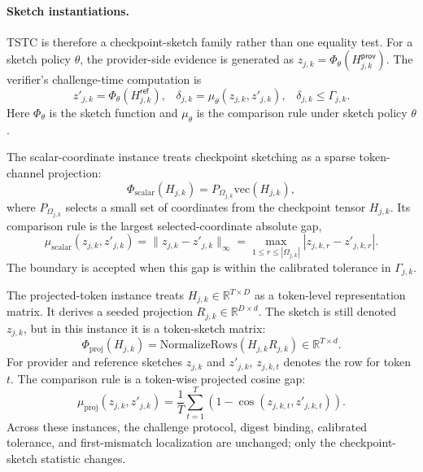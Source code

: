 \documentclass[sigplan,screen,review,anonymous]{acmart}
\begin{document}
\paragraph{Sketch instantiations.}
TSTC is therefore a checkpoint-sketch family rather than one equality test.
For a sketch policy \(\theta\), the provider-side evidence is generated as
\(z_{j,k}=\Phi_{\theta}(H^{\mathsf{prov}}_{j,k})\). The verifier's
challenge-time computation is
\begin{equation}
z'_{j,k}=\Phi_{\theta}(H^{\mathsf{ref}}_{j,k}),\;\;\;
\delta_{j,k}=\mu_{\theta}(z_{j,k},z'_{j,k}),\;\;\;
\delta_{j,k}\le\Gamma_{j,k}.
\end{equation}
Here \(\Phi_{\theta}\) is the sketch function and \(\mu_{\theta}\) is the
comparison rule under sketch policy \(\theta\).

The scalar-coordinate instance treats checkpoint sketching as a sparse
token-channel projection:
\begin{equation}
\Phi_{\mathrm{scalar}}(H_{j,k})
  = P_{\Omega_{j,k}}\mathrm{vec}(H_{j,k}),
\end{equation}
where \(P_{\Omega_{j,k}}\) selects a small set of coordinates from the
checkpoint tensor \(H_{j,k}\). Its comparison rule is the largest selected-coordinate
absolute gap,
\begin{equation}
\mu_{\mathrm{scalar}}(z_{j,k},z'_{j,k})
  = \|z_{j,k}-z'_{j,k}\|_{\infty}
  = \max_{1\le r\le|\Omega_{j,k}|}|z_{j,k,r}-z'_{j,k,r}|.
\end{equation}
The boundary is accepted when this gap is within the calibrated tolerance in
\(\Gamma_{j,k}\).

The projected-token instance treats
\(H_{j,k}\in\mathbb{R}^{T\times D}\) as a token-level representation matrix.
It derives a seeded projection \(R_{j,k}\in\mathbb{R}^{D\times d}\). The
sketch is still denoted \(z_{j,k}\), but in this instance it is a
token-sketch matrix:
\begin{equation}
\Phi_{\mathrm{proj}}(H_{j,k})
  =\mathrm{NormalizeRows}(H_{j,k}R_{j,k})\in\mathbb{R}^{T\times d}.
\end{equation}
For provider and reference sketches \(z_{j,k}\) and \(z'_{j,k}\),
\(z_{j,k,t}\) denotes the row for token \(t\). The comparison rule is a
token-wise projected cosine gap:
\begin{equation}
\mu_{\mathrm{proj}}(z_{j,k},z'_{j,k})
  = \frac{1}{T}\sum_{t=1}^{T}
    \left(1-\cos(z_{j,k,t},z'_{j,k,t})\right).
\end{equation}
Across these instances, the challenge protocol, digest binding, calibrated
tolerance, and first-mismatch localization are unchanged; only the
checkpoint-sketch statistic changes.
\end{document}

